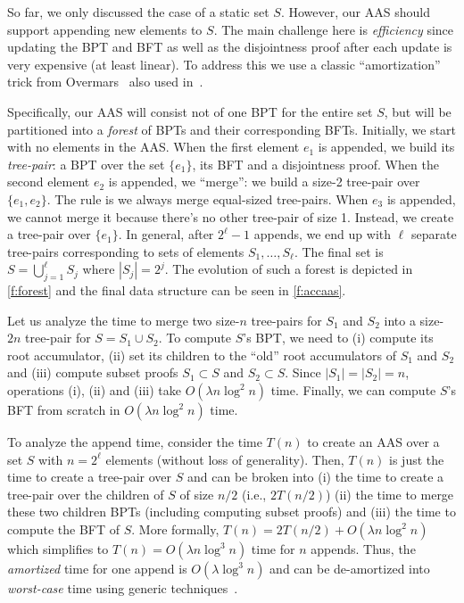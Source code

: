 So far, we only discussed the case of a static set $S$.
However, our AAS should support appending new elements to $S$. 
The main challenge here is \emph{efficiency} since updating the BPT and BFT as well as the disjointness proof after each update is very expensive (at least linear).
To address this we use a classic ``amortization'' trick from Overmars~\cite{overmars} also used in~\cite{distributed-acc}. 

Specifically, our AAS will consist not of one BPT for the entire set $S$, but will be partitioned into a \textit{forest} of BPTs and their corresponding BFTs.
Initially, we start with no elements in the AAS.
When the first element $e_1$ is appended, we build its \textit{tree-pair}: a BPT over the set $\{e_1\}$, its BFT and a disjointness proof.
When the second element $e_2$ is appended, we ``merge'': we build a size-2 tree-pair over $\{e_1, e_2\}$.
The rule is we always merge equal-sized tree-pairs.
When $e_3$ is appended, we cannot merge it because there's no other tree-pair of size 1.
Instead, we create a tree-pair over $\{e_1\}$.
In general, after $2^\ell - 1$ appends, we end up with $\ell$ separate tree-pairs corresponding to sets of elements $S_1,\dots,S_\ell$.
The final set is $S=\bigcup_{j=1}^{\ell} S_j$ where $|S_j| = 2^j$.
The evolution of such a forest is depicted in \cref{f:forest} and the final data structure can be seen in \cref{f:accaas}.

Let us analyze the time to merge two size-$n$ tree-pairs for $S_1$ and $S_2$ into a size-$2n$ tree-pair for $S=S_1 \cup S_2$.
To compute $S$'s BPT, we need to (i) compute its root accumulator, (ii) set its children to the ``old'' root accumulators of $S_1$ and $S_2$ and (iii) compute subset proofs $S_1 \subset S$ and $S_2\subset S$.
Since $|S_1|=|S_2|=n$, operations (i), (ii) and (iii) take $O(\lambda n \log^2{n})$ time.
Finally, we can compute $S$'s BFT from scratch in $O(\lambda n\log^2 n)$ time.

To analyze the append time, consider the time $T(n)$ to create an AAS over a set $S$ with $n = 2^\ell$ elements (without loss of generality).
Then, $T(n)$ is just the time to create a tree-pair over $S$ and can be broken into (i) the time to create a tree-pair over the children of $S$ of size $n/2$ (i.e., $2T(n/2)$) (ii) the time to merge these two children BPTs (including computing subset proofs) and (iii) the time to compute the BFT of $S$.
More formally, $T(n) = 2T(n/2) + O(\lambda n\log^2{n})$ which simplifies to $T(n) = O(\lambda n\log^3{n})$ time for $n$ appends.
Thus, the \textit{amortized} time for one append is $O(\lambda \log^3 {n})$ and can be de-amortized into \textit{worst-case} time using generic techniques~\cite{overmars,overmars-van-leeuwen}.

